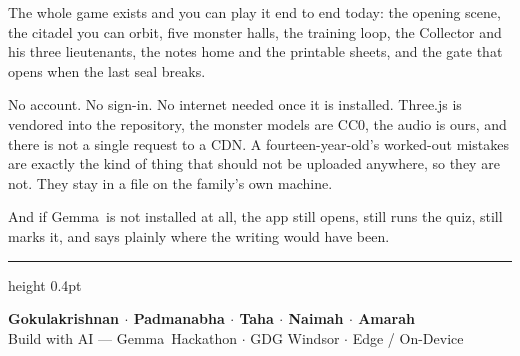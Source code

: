 \documentclass[11pt]{article}
\newcommand{\themodel}{Gemma}
\begin{document}
\vspace{0.3em}
The whole game exists and you can play it end to end today: the opening scene,
the citadel you can orbit, five monster halls, the training loop, the Collector
and his three lieutenants, the notes home and the printable sheets, and the
gate that opens when the last seal breaks.

No account. No sign-in. No internet needed once it is installed. Three.js is
vendored into the repository, the monster models are CC0, the audio is ours,
and there is not a single request to a CDN. A fourteen-year-old's worked-out
mistakes are exactly the kind of thing that should not be uploaded anywhere, so
they are not. They stay in a file on the family's own machine.

And if \themodel\ is not installed at all, the app still opens, still runs the
quiz, still marks it, and says plainly where the writing would have been.

\vfill
{\color{Muted}\hrule height 0.4pt}
\vspace{0.6em}
\begin{center}
{\sffamily\small\bfseries\color{Coral}Gokulakrishnan $\cdot$ Padmanabha $\cdot$
Taha $\cdot$ Naimah $\cdot$ Amarah}\\[0.3em]
{\small\color{Muted}Build with AI --- \themodel\ Hackathon $\cdot$ GDG Windsor
$\cdot$ Edge / On-Device}
\end{center}
\end{document}
